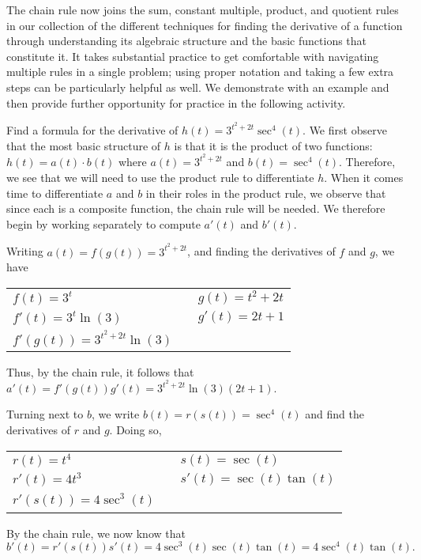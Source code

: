 The chain rule now joins the sum, constant multiple, product, and quotient rules in our collection of the different techniques for finding the derivative of a function through understanding its algebraic structure and the basic functions that constitute it.  It takes substantial practice to get comfortable with navigating multiple rules in a single problem; using proper notation and taking a few extra steps can be particularly helpful as well.  We demonstrate with an example and then provide further opportunity for practice in the following activity.

\bex
Find a formula for the derivative of $h(t) = 3^{t^2 + 2t}\sec^4(t)$. 
\eex
We first observe that the most basic structure of $h$ is that it is the product of two functions:  $h(t) = a(t) \cdot b(t)$ where $a(t) = 3^{t^2 + 2t}$ and $b(t) = \sec^4(t)$.  Therefore, we see that we will need to use the product rule to differentiate $h$.  When it comes time to differentiate $a$ and $b$ in their roles in the product rule, we observe that since each is a composite function, the chain rule will be needed.  We therefore begin by working separately to compute $a'(t)$ and $b'(t)$.

Writing $a(t) = f(g(t)) = 3^{t^2 + 2t}$, and finding the derivatives of $f$ and $g$, we have
\begin{center}
\begin{tabular}{lcl}
$f(t) = 3^t$ & \hspace{0.5in} & $g(t) = t^2 + 2t$ \\
$f'(t) = 3^t \ln(3)$ & \hspace{0.5in} & $g'(t) = 2t+1$ \\
$f'(g(t)) = 3^{t^2 + 2t}\ln(3)$ & \hspace{0.5in} & \ \\
\end{tabular}
\end{center}
Thus, by the chain rule, it follows that $a'(t) = f'(g(t))g'(t) = 3^{t^2 + 2t}\ln(3) (2t+1).$

Turning next to $b$, we write $b(t) = r(s(t)) = \sec^4(t)$ and find the derivatives of $r$ and $g$.  Doing so, 
\begin{center}
\begin{tabular}{lcl}
$r(t) = t^4$ & \hspace{0.5in} & $s(t) = \sec(t)$ \\
$r'(t) = 4t^3$ & \hspace{0.5in} & $s'(t) = \sec(t)\tan(t)$ \\
$r'(s(t)) = 4\sec^3(t)$ & \hspace{0.5in} & \ \\
\end{tabular}
\end{center}
By the chain rule, we now know that $b'(t) = r'(s(t))s'(t) = 4\sec^3(t)\sec(t)\tan(t) = 4 \sec^4(t) \tan(t).$

